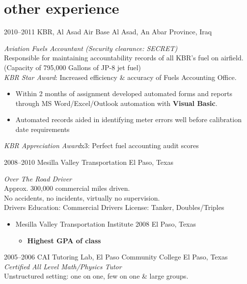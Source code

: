 \documentclass[]{friggeri-cv} %
\begin{document}

\section{other experience}

\begin{entrylist}
\entry
{2010--2011}
{KBR, Al Asad Air Base}
{Al Asad, An Abar Province, Iraq}
{\emph{Aviation Fuels Accountant (Security clearance: SECRET)} \\
Responsible for maintaining accountability records of all KBR's fuel on airfield. 
(Capacity of 795,000 Gallons of JP-8 jet fuel) \\
\emph{KBR Star Award}: Increased efficiency \& accuracy of Fuels Accounting Office.
\begin{itemize}
\item Within 2 months of assignment developed automated forms and reports through MS Word/Excel/Outlook automation with \textbf{Visual Basic}.
\item Automated records aided in identifying meter errors well before calibration date requirements
\end{itemize}
\emph{KBR Appreciation Award}x3: Perfect fuel accounting audit scores
}
\entry
{2008--2010}
{Mesilla Valley Transportation}
{El Paso, Texas}
{\emph{Over The Road Driver} \\
Approx. 300,000 commercial miles driven. \\
No accidents, no incidents, virtually no supervision. \\
Drivers Education: Commercial Drivers License: Tanker, Doubles/Triples
\begin{itemize}
\item Mesilla Valley Transportation Institute 2008 El Paso, Texas
\begin{itemize}
\item \textbf{Highest GPA of class}
\end{itemize}
\end{itemize}}
\entry
{2005--2006}
{CAI Tutoring Lab, El Paso Community College}
{El Paso, Texas}
{\emph{Certified All Level Math/Physics Tutor} \\
Unstructured setting: one on one, few on one \& large groups.}

\end{entrylist}
\end{document}
